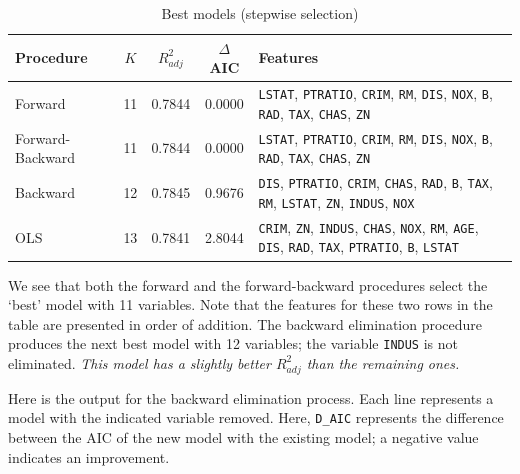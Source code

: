 \documentclass[10pt]{article}
\begin{document}
    \begin{table}[H]
        \centering
        \caption{Best models (stepwise selection)}
        \vspace{0.8em}
        \label{tab:models_all}
        \begin{tabular}{|l|c|c|c|l|} \hline
            Procedure & $K$ & $R^2_{adj}$ & $\Delta$AIC & Features \\\hline
            Forward          &  11& 0.7844& 0.0000  &\footnotesize\texttt{LSTAT}, \texttt{PTRATIO}, \texttt{CRIM}, \texttt{RM}, \texttt{DIS}, \texttt{NOX}, \texttt{B}, \texttt{RAD}, \texttt{TAX}, \texttt{CHAS}, \texttt{ZN} \\
            Forward-Backward &  11& 0.7844& 0.0000  &\footnotesize\texttt{LSTAT}, \texttt{PTRATIO}, \texttt{CRIM}, \texttt{RM}, \texttt{DIS}, \texttt{NOX}, \texttt{B}, \texttt{RAD}, \texttt{TAX}, \texttt{CHAS}, \texttt{ZN} \\
            Backward         &  12& 0.7845& 0.9676  &\footnotesize\texttt{DIS}, \texttt{PTRATIO}, \texttt{CRIM}, \texttt{CHAS}, \texttt{RAD}, \texttt{B}, \texttt{TAX}, \texttt{RM}, \texttt{LSTAT}, \texttt{ZN}, \texttt{INDUS}, \texttt{NOX} \\
            OLS              &  13& 0.7841& 2.8044  &\footnotesize\texttt{CRIM}, \texttt{ZN}, \texttt{INDUS}, \texttt{CHAS}, \texttt{NOX}, \texttt{RM}, \texttt{AGE}, \texttt{DIS}, \texttt{RAD}, \texttt{TAX}, \texttt{PTRATIO}, \texttt{B}, \texttt{LSTAT} \\\hline
        \end{tabular}
    \end{table}

    We see that both the forward and the forward-backward procedures select the
    `best' model with 11 variables. Note that the features for these two rows in the
    table are presented in order of addition. The backward elimination procedure
    produces the next best model with 12 variables; the variable \texttt{INDUS} is
    not eliminated. \emph{This model has a slightly better $R^2_{adj}$ than the
    remaining ones.}

    Here is the output for the backward elimination process. Each line represents a
    model with the indicated variable removed. Here, \texttt{D\_AIC} represents the
    difference between the AIC of the new model with the existing model; a negative
    value indicates an improvement.
\end{document}
